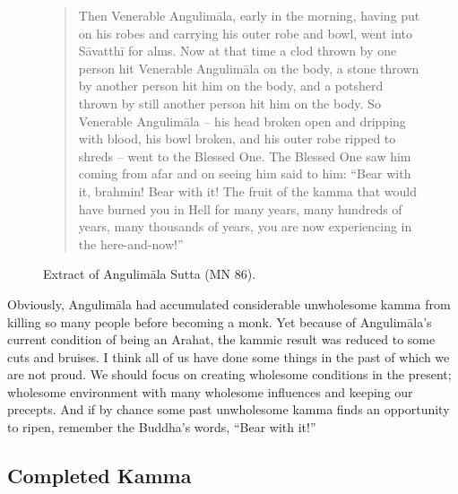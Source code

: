 \begin{figure}[H]
\begin{quotation}
Then Venerable Angulimāla, early in the morning, having put on his robes and carrying his outer robe and bowl, went into Sāvatthī for alms. Now at that time a clod thrown by one person hit Venerable Angulimāla on the body, a stone thrown by another person hit him on the body, and a potsherd thrown by still another person hit him on the body. So Venerable Angulimāla – his head broken open and dripping with blood, his bowl broken, and his outer robe ripped to shreds – went to the Blessed One. The Blessed One saw him coming from afar and on seeing him said to him: “Bear with it, brahmin! Bear with it! The fruit of the kamma that would have burned you in Hell for many years, many hundreds of years, many thousands of years, you are now experiencing in the here-and-now!”
\end{quotation}
\caption{Extract of Angulimāla Sutta (MN 86).}
\label{fig:MN86}
\end{figure}

Obviously, Angulimāla had accumulated considerable unwholesome kamma from killing so many people before becoming a monk. Yet because of Angulimāla’s current condition of being an Arahat, the kammic result was reduced to some cuts and bruises. I think all of us have done some things in the past of which we are not proud. We should focus on creating wholesome conditions in the present; wholesome environment with many wholesome influences and keeping our precepts. And if by chance some past unwholesome kamma finds an opportunity to ripen, remember the Buddha’s words, “Bear with it!”

\subsection*{Completed Kamma}

